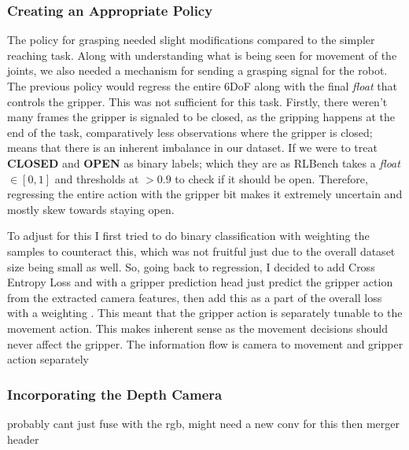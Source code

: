 \subsubsection{Creating an Appropriate Policy}
The policy for grasping needed slight modifications compared to the simpler reaching task. Along with understanding what is being seen for movement of the joints, we also needed a mechanism for sending a grasping signal for the robot. The previous policy would regress the entire 6DoF along with the final \emph{float} that controls the gripper. This was not sufficient for this task. Firstly, there weren't many frames the gripper is signaled to be closed, as the gripping happens at the end of the task, comparatively less observations where the gripper is closed; means that there is an inherent imbalance in our dataset. If we were to treat \textbf{CLOSED} and \textbf{OPEN} as binary labels; which they are as RLBench takes a \emph{float} $\in \left[0, 1\right]$ and thresholds at $ > 0.9$ to check if it should be open. Therefore, regressing the entire action with the gripper bit makes it extremely uncertain and mostly skew towards staying open. 

To adjust for this I first tried to do binary classification with weighting the samples to counteract this, which was not fruitful just due to the overall dataset size being small as well. So, going back to regression, I decided to add Cross Entropy Loss and with a gripper prediction head just predict the gripper action from the extracted camera features, then add this as a part of the overall loss with a weighting . This meant that the gripper action is separately tunable to the movement action. This makes inherent sense as the movement decisions should never affect the gripper. The information flow is camera to movement and gripper action separately  


\subsubsection{Incorporating the Depth Camera}
probably cant just fuse with the rgb, might need a new conv for this then merger header
